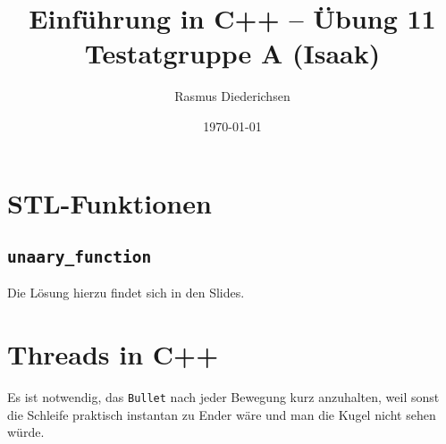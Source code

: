 \documentclass{article}
\title{Einführung in C++ -- Übung 11 \\ Testatgruppe A (Isaak)}
\author{Rasmus Diederichsen}
\date{\today}
\begin{document}
   \maketitle

   \section{STL-Funktionen}
   
   \subsection{\texttt{unaary\_function}}
   
   Die Lösung hierzu findet sich in den Slides.
   
   

   \subsection{}

   
   
   \section{Threads in C++}
   
   

   Es ist notwendig, das \texttt{Bullet} nach jeder Bewegung kurz anzuhalten,
   weil sonst die Schleife praktisch instantan zu Ender wäre und man die Kugel
   nicht sehen würde.
   
\end{document}
